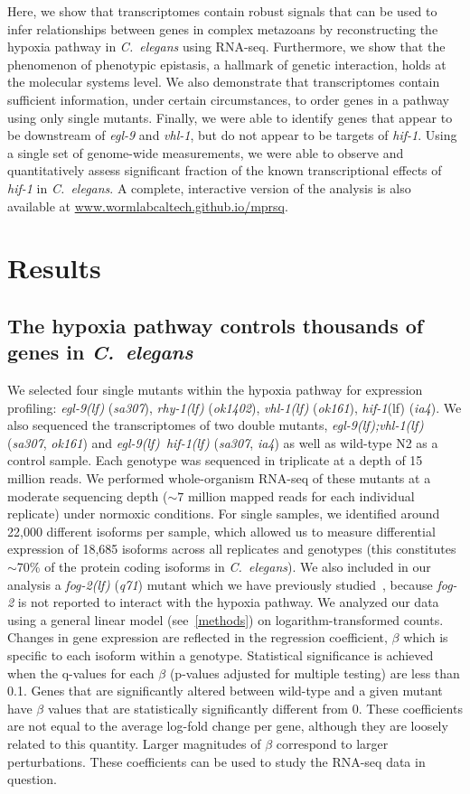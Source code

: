 \documentclass[9pt,twocolumn,twoside]{pnas-new}
\newcommand{\cel}{\emph{C.~elegans}}
\newcommand{\gene}[1]{\emph{#1}}
\newcommand{\fog}{\emph{\mbox{fog-2(lf)}}}
\newcommand{\egl}{\emph{\mbox{egl-9}(lf)}}
\newcommand{\rhy}{\emph{\mbox{rhy-1}(lf)}}
\newcommand{\vhl}{\emph{\mbox{vhl-1}(lf)}}
\newcommand{\eglvhl}{\emph{\mbox{egl-9(lf);vhl-1(lf)}}}
\newcommand{\eglhif}{\emph{\mbox{egl-9(lf)}~\mbox{hif-1(lf)}}}
\newcommand{\hif}{\emph{\mbox{hif-1}}(lf)}
\begin{document}
Here, we show that transcriptomes contain robust signals that can be
used to infer relationships between genes in complex metazoans by reconstructing
the hypoxia pathway in \cel{} using RNA-seq.
Furthermore, we show that the phenomenon of phenotypic epistasis, a hallmark of
genetic interaction, holds at the molecular systems level.
We also demonstrate that transcriptomes contain sufficient information, under
certain circumstances, to order genes in a pathway using only single mutants.
Finally, we were able to identify genes that appear to be downstream of \gene{egl-9}
and \gene{vhl-1}, but do not appear to be targets of \gene{hif-1}.
Using a single set of genome-wide measurements, we were able to observe and
quantitatively assess  significant fraction of the known transcriptional
effects of \gene{hif-1} in \cel{}.
A complete, interactive version of the analysis is also available at
\url{www.wormlabcaltech.github.io/mprsq}.

\section*{Results}
\subsection*{The hypoxia pathway controls thousands of genes in \cel{}}
\label{sub:summary}

We selected four single mutants within the hypoxia pathway for expression profiling:
\egl{} (\emph{sa307}), \rhy{} (\emph{ok1402}), \vhl{} (\emph{ok161}), \hif{} (\emph{ia4}).
We also sequenced the transcriptomes of two double mutants, \eglvhl{} (\emph{sa307},
\emph{ok161}) and \eglhif{} (\emph{sa307}, \emph{ia4}) as well as wild-type N2 as
a control sample. Each genotype  was sequenced in triplicate at a depth of 15
million reads. We performed whole-organism RNA-seq of these mutants at a moderate
sequencing depth ($\sim7$ million mapped reads for each individual replicate)
under normoxic conditions. For single samples, we identified around 22,000 different
isoforms per sample, which allowed us to measure differential expression of 18,685
isoforms across all replicates and genotypes (this constitutes  $\sim$70\% of
the protein coding isoforms in \cel{}).
We also included in our analysis a \fog{} (\emph{q71}) mutant which we have previously
studied~\cite{Angeles-Albores2016a}, because \gene{fog-2} is not reported to
interact with the hypoxia pathway.
We analyzed our data using a general linear model (see~\ref{methods}) on
logarithm-transformed counts. Changes in gene expression are reflected in the
regression coefficient, $\beta$ which is specific to each isoform within a genotype.
Statistical significance is achieved when the q-values for each $\beta$ (p-values
adjusted for multiple testing) are less than 0.1. Genes that are significantly
altered between wild-type and a given mutant have $\beta$ values that are
statistically significantly different from 0.  These coefficients are not equal
to the average log-fold change per gene, although they are loosely related to
this quantity. Larger magnitudes of $\beta$ correspond to larger perturbations.
These coefficients can be used to study the RNA-seq data in question.
\end{document}
